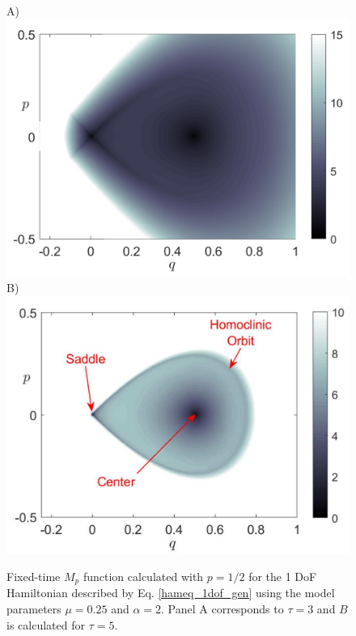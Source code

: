 \documentclass{ws-ijbc}
\begin{document}
\begin{figure}[!ht]
	\begin{center}		
		A)\includegraphics[scale=0.32]{figAppA_1a}
		B)\includegraphics[scale=0.32]{figAppA_1b}
	\end{center}
	\caption{Fixed-time $M_p$ function calculated with $p = 1/2$ for the 1 DoF Hamiltonian described by Eq. \eqref{hameq_1dof_gen} using the model parameters $\mu = 0.25$ and $\alpha = 2$. Panel A corresponds to $\tau = 3$ and $B$ is calculated for $\tau = 5$.}
	\label{ld_fixTime}
\end{figure}
\end{document}
